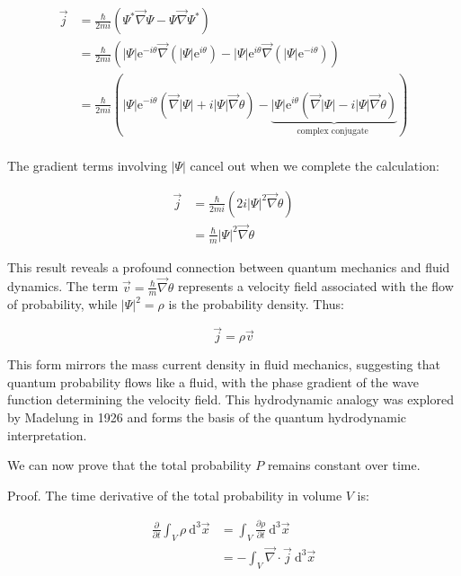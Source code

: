 \documentclass[10pt]{article}
\begin{document}
\begin{align*}
\vec{j} &= \frac{\hbar}{2 m i}\left(\Psi^{*} \vec{\nabla} \Psi-\Psi \vec{\nabla} \Psi^{*}\right) \\
&= \frac{\hbar}{2 m i}\left(|\Psi| \mathrm{e}^{-i \theta} \vec{\nabla}\left(|\Psi| \mathrm{e}^{i \theta}\right)-|\Psi| \mathrm{e}^{i \theta} \vec{\nabla}\left(|\Psi| \mathrm{e}^{-i \theta}\right)\right) \\
&= \frac{\hbar}{2 m i}(|\Psi| \mathrm{e}^{-i \theta}(\vec{\nabla}|\Psi|+i|\Psi| \vec{\nabla} \theta)-\underbrace{|\Psi| \mathrm{e}^{i \theta}(\vec{\nabla}|\Psi|-i|\Psi| \vec{\nabla} \theta)}_{\text {complex conjugate }}) \tag{1.35} \\
\end{align*}

The gradient terms involving $|\Psi|$ cancel out when we complete the calculation:

\begin{align*}
\vec{j} &= \frac{\hbar}{2 m i}\left(2 i|\Psi|^{2} \vec{\nabla} \theta\right) \\
&= \frac{\hbar}{m}|\Psi|^{2} \vec{\nabla} \theta
\end{align*}

This result reveals a profound connection between quantum mechanics and fluid dynamics. The term $\vec{v}=\frac{\hbar}{m} \vec{\nabla} \theta$ represents a velocity field associated with the flow of probability, while $|\Psi|^2 = \rho$ is the probability density. Thus:

\begin{equation*}
\vec{j}=\rho \vec{v} \tag{1.36}
\end{equation*}

This form mirrors the mass current density in fluid mechanics, suggesting that quantum probability flows like a fluid, with the phase gradient of the wave function determining the velocity field. This hydrodynamic analogy was explored by Madelung in 1926 and forms the basis of the quantum hydrodynamic interpretation.

We can now prove that the total probability $P$ remains constant over time.

Proof. The time derivative of the total probability in volume $V$ is:

\begin{align*}
\frac{\partial}{\partial t} \int_{V} \rho \mathrm{~d}^{3} \vec{x} &= \int_{V} \frac{\partial \rho}{\partial t} \mathrm{~d}^{3} \vec{x} \tag{1.37} \\
&= -\int_{V} \vec{\nabla} \cdot \vec{j} \mathrm{~d}^{3} \vec{x}
\end{align*}
\end{document}
